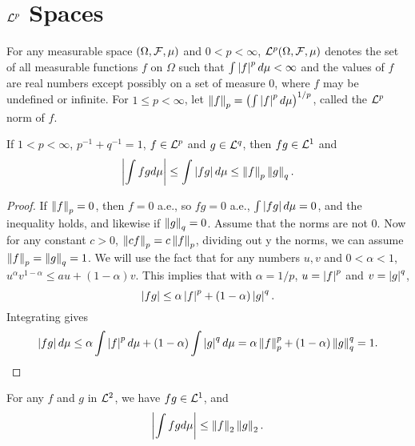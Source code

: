 \chapter{$\Lp^p$ Spaces}

\begin{definition}[$\Lp^p$ norm of $f$]
For any measurable space $(\Omega, \mathcal F, \mu)$ and $0< p<\infty$, $\mathcal L^p(\Omega, \mathcal F, \mu)$ denotes the set of all measurable functions $f$ on $\Omega$ such that $\int \left\lvert f\right\rvert^pd\mu<\infty$ and the values of $f$ are real numbers except possibly on a set of measure 0, where $f$ may be undefined or infinite. For $1\leq p<\infty$, let $\left\lVert f\right\rVert_p=\left(\int \left\lvert f\right\rvert^p d\mu \right)^{1/p}$, called the $\Lp^p$ norm of $f$.
\end{definition}




\begin{theorem}
If $1<p<\infty$, $p^{-1}+q^{-1}=1$, $f\in \mathcal L^p$ and $g\in \mathcal L^q$, then $fg\in\mathcal L^1$ and
\begin{equation*}
\left\lvert \int fgd\mu\right\rvert\leq \int \left\lvert fg\right\rvert d\mu\leq \left\lVert f\right\rVert_p\left\lVert g\right\rVert_q.
\end{equation*}
\end{theorem}



\begin{proof}
If $\left\lVert f\right\rVert_p=0$, then $f=0$ a.e., so $fg=0$ a.e., $\int\left\lvert fg\right\rvert d\mu=0$, and the inequality holds, and likewise if $\left\lVert g\right\rVert_q=0$. Assume that the norms are not 0. Now for any constant $c>0$, $\left\lVert cf\right\rVert_p=c\left\lVert f\right\rVert_p$, dividing out y the norms, we can assume $\left\lVert f\right\rVert_p=\left\lVert g\right\rVert_q=1$. We will use the fact that for any numbers $u,v$ and $0<\alpha <1$, $u^\alpha v^{1-\alpha}\leq au+(1-\alpha)v$. This implies that with $\alpha=1/p$, $u=\left\lvert f\right\rvert^p$ and $v=\left\lvert g\right\rvert^q$, 
\begin{equation*}
\left\lvert fg\right\rvert\leq \alpha\left\lvert f\right\rvert^p+(1-\alpha)\left\lvert g\right\rvert^q.
\end{equation*}
Integrating gives
\begin{equation*}
\left\lvert fg\right\rvert d\mu\leq \alpha\int\left\lvert f\right\rvert^pd\mu + (1-\alpha)\int\left\lvert g\right\rvert^qd\mu=\alpha\left\lVert f\right\rVert^p_p+(1-\alpha)\left\lVert g\right\rVert^q_q=1.
\end{equation*}
\end{proof}


\begin{corollary}
For any $f$ and $g$ in $\mathcal L^2$, we have $fg\in\mathcal L^1$, and
\begin{equation*}
\left\lvert \int fgd\mu\right\rvert\leq \left\lVert f\right\rVert_2\left\lVert g\right\rVert_2.
\end{equation*}
\end{corollary}




